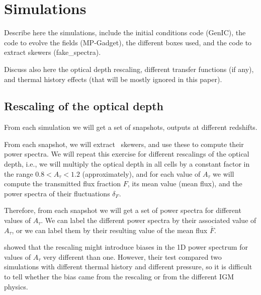 \section{Simulations}
\label{sec:sims}

Describe here the simulations, include the initial conditions code (GenIC), 
the code to evolve the fields (MP-Gadget), the different boxes used, 
and the code to extract skewers (fake\_spectra).

Discuss also here the optical depth rescaling, different transfer functions
(if any), and thermal history effects (that will be mostly ignored in this
paper).


\subsection{Rescaling of the optical depth}

From each simulation we will get a set of snapshots, outputs at different 
redshifts. 

From each snapshot, we will extract \lya\ skewers, and use these to compute 
their power spectra. 
We will repeat this exercise for different rescalings of the optical depth, 
i.e., we will multiply the optical depth in all cells by a constant factor
in the range $0.8 < A_\tau < 1.2$ (approximately), and for each value of 
$A_\tau$ we will compute the transmitted flux fraction $F$, its mean value
(mean flux), and the power spectra of their fluctuations $\delta_F$. 

Therefore, from each snapshot we will get a set of power spectra for different
values of $A_\tau$.
We can label the different power spectra by their associated value of $A_\tau$,
or we can label them by their resulting value of the mean flux $\bar F$. 

\cite{Lukic2015} showed that the rescaling might introduce biases in the 
1D power spectrum for values of $A_\tau$ very different than one. 
However, their test compared two simulations with different thermal history
and different pressure, so it is difficult to tell whether the bias came 
from the rescaling or from the different IGM physics.



